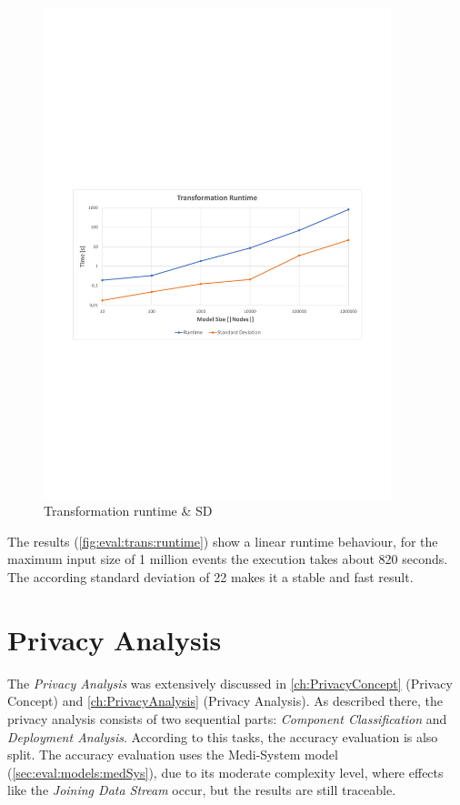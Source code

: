 \begin{figure}[h]
	\centering
	\includegraphics[trim = 10mm 90mm 10mm 110mm, clip, width=0.90\textwidth]{graphs/Runtime_Transformation}
	\caption{Transformation runtime \& SD}
	\label{fig:eval:trans:runtime}
\end{figure}

The results (\autoref{fig:eval:trans:runtime}) show a linear runtime behaviour, for the maximum input size of 1 million events the execution takes about 820 seconds. The according standard deviation of 22 makes it a stable and fast result.

\section{Privacy Analysis}
\label{sec:Evaluation:privacyanalysis}

The \textit{Privacy Analysis} was extensively discussed in \autoref{ch:PrivacyConcept} (Privacy Concept) and \autoref{ch:PrivacyAnalysis} (Privacy Analysis). As described there, the privacy analysis consists of two sequential parts: \textit{Component Classification} and \textit{Deployment Analysis}. According to this tasks, the accuracy evaluation is also split. The accuracy evaluation uses the Medi-System model (\autoref{sec:eval:models:medSys}), due to its moderate complexity level, where effects like the \textit{Joining Data Stream} occur, but the results are still traceable.

